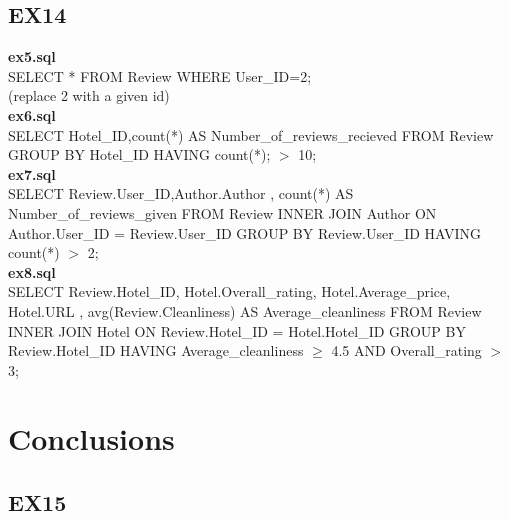 \documentclass{article}
\begin{document}
	\subsection{EX14}
	\textbf{ex5.sql} \\
	SELECT  * FROM Review WHERE User\_ID=2;
	\\
	(replace 2 with a given id)
	\\
	\textbf{ex6.sql} \\
	SELECT Hotel\_ID,count(*) AS Number\_of\_reviews\_recieved
	FROM Review
	GROUP BY Hotel\_ID HAVING count(*); 
	\begin{math}
	>
	\end{math} 
	10;
	\\
	\textbf{ex7.sql} \\
	SELECT Review.User\_ID,Author.Author , count(*) AS Number\_of\_reviews\_given
	FROM Review INNER JOIN Author ON Author.User\_ID = Review.User\_ID 
	GROUP BY Review.User\_ID HAVING count(*) 
	\begin{math}
	>
	\end{math} 
	2;
	\\
	\textbf{ex8.sql} \\
	SELECT Review.Hotel\_ID, Hotel.Overall\_rating, Hotel.Average\_price, Hotel.URL , avg(Review.Cleanliness) AS Average\_cleanliness
	FROM Review INNER JOIN Hotel ON Review.Hotel\_ID = Hotel.Hotel\_ID 
	GROUP BY Review.Hotel\_ID HAVING Average\_cleanliness 
	\begin{math}
	\geq
	\end{math}
	 4.5 AND Overall\_rating 
	 \begin{math}
	 >
	 \end{math}
	 3;
	
	\section{Conclusions}
	
	\subsection{EX15}
\end{document}
